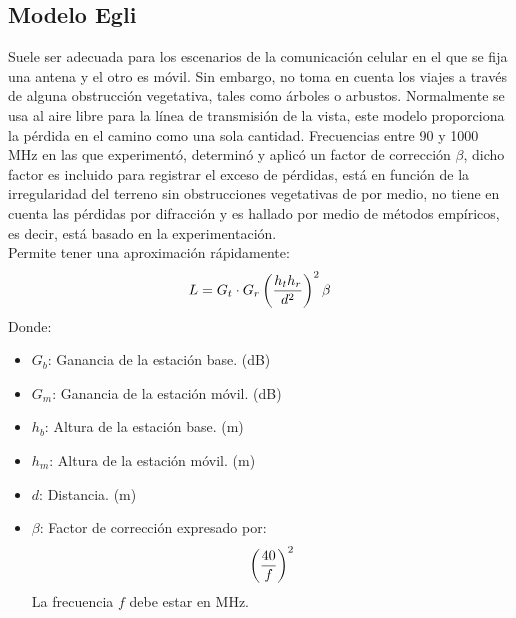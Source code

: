 \documentclass[
	12pt, %
	fleqn, %
	a4paper, %
	oneside, %
]{LegrandOrangeBook}
\begin{document}
\subsection{Modelo Egli}
Suele ser adecuada para los escenarios de la comunicación celular en el que se fija una antena y el otro es móvil. Sin embargo, no toma en cuenta los viajes a través de alguna obstrucción vegetativa, tales como árboles o arbustos. Normalmente se usa al aire libre para la línea de transmisión de la vista, este modelo proporciona la pérdida en el camino como una sola cantidad. Frecuencias entre 90 y 1000 MHz en las que experimentó, determinó y aplicó un factor de corrección $\beta$, dicho factor es incluido para registrar el exceso de pérdidas, está en función de la irregularidad del terreno sin obstrucciones vegetativas de por medio, no tiene en cuenta las pérdidas por difracción y es hallado por medio de métodos empíricos, es decir, está basado en la experimentación.\\
Permite tener una aproximación rápidamente:
\begin{equation}
L=G_t\cdot G_r\left(\frac{h_th_r}{d^2}\right)^2\beta
\end{equation}
Donde:
\begin{itemize}
\item $G_b$: Ganancia de la estación base. (dB)
\item $G_m$: Ganancia de la estación móvil. (dB)
\item $h_b$: Altura de la estación base. (m)
\item $h_m$: Altura de la estación móvil. (m)
\item $d$: Distancia. (m)
\item $\beta$: Factor de corrección expresado por:
\begin{equation}
\left(\frac{40}{f}\right)^2
\end{equation}
La frecuencia $f$ debe estar en MHz.
\end{itemize}
\end{document}
